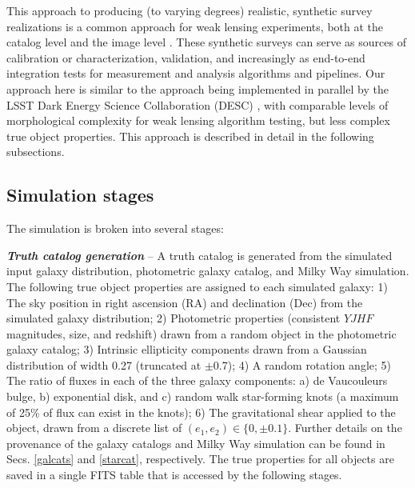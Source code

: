 \documentclass[aps,prd, amsmath,amssymb,superscriptaddress,showkeys,nofootinbib,reprint,preprintnumbers]{revtex4-1}
\begin{document}
This approach to producing (to varying degrees) realistic, synthetic survey realizations is a common approach for weak lensing experiments, both at the catalog level \cite{2018MNRAS.480.4614M,2019arXiv190706530K} and the image level \cite{2016MNRAS.457..786S,2018MNRAS.475.4524S,2017MNRAS.467.1627F,2018MNRAS.481.3170M}. These synthetic surveys can serve as sources of calibration or characterization, validation, and increasingly as end-to-end integration tests for measurement and analysis algorithms and pipelines. Our approach here is similar to the approach being implemented in parallel by the LSST Dark Energy Science Collaboration (DESC) \cite{2019arXiv190706530K}, with comparable levels of morphological complexity for weak lensing algorithm testing, but less complex true object properties. This approach is described in detail in the following subsections.

\subsection{Simulation stages}\label{stages}

The simulation is broken into several stages:

\textbf{\textit{Truth catalog generation}} -- A truth catalog is generated from the simulated input galaxy distribution, photometric galaxy catalog, and Milky Way simulation. 
The following true object properties are assigned to each simulated galaxy:
1) The sky position in right ascension (RA) and declination (Dec) from the simulated galaxy distribution; 
2) Photometric properties (consistent $YJHF$ magnitudes, size, and redshift) drawn from a random object in the photometric galaxy catalog; 
3) Intrinsic ellipticity components drawn from a Gaussian distribution of width 0.27 (truncated at $\pm$0.7); 
4) A random rotation angle; 
5) The ratio of fluxes in each of the three galaxy components: a) de Vaucouleurs bulge, b) exponential disk, and c) random walk star-forming knots (a maximum of 25\% of flux can exist in the knots); 
6) The gravitational shear applied to the object, drawn from a discrete list of $(e_1, e_2) \in \{0,\pm 0.1\}$.
Further details on the provenance of the galaxy catalogs and Milky Way simulation can be found in Secs. \ref{galcats} and \ref{starcat}, respectively. 
The true properties for all objects are saved in a single FITS table that is accessed by the following stages.
\end{document}
